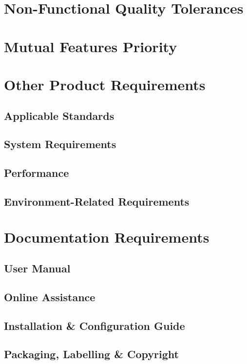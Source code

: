 \documentclass[12pt,a4paper,oneside, titlepage]{article}
\begin{document}
    \newpage
	\section{Non-Functional Quality Tolerances}
	
	\newpage
	\section{Mutual Features Priority}
	
    \newpage
	\section{Other Product Requirements}
	\subsection{Applicable Standards}
	\subsection{System Requirements}
	\subsection{Performance}
	\subsection{Environment-Related Requirements}

    \newpage
	\section{Documentation Requirements}
	\subsection{User Manual}
	\subsection{Online Assistance}
	\subsection{Installation \& Configuration Guide}
	\subsection{Packaging, Labelling \& Copyright}
    \newpage
    {}
    
\end{document}
